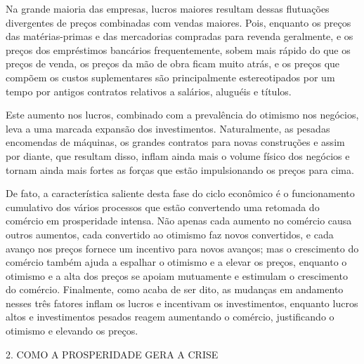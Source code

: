 \documentclass[12pt]{article}
\begin{document}
Na grande maioria das empresas, lucros maiores resultam dessas flutuações divergentes de preços combinadas com vendas maiores. Pois, enquanto os preços das matérias-primas e das mercadorias compradas para revenda geralmente, e os preços dos empréstimos bancários frequentemente, sobem mais rápido do que os preços de venda, os preços da mão de obra ficam muito atrás, e os preços que compõem os custos suplementares são principalmente estereotipados por um tempo por antigos contratos relativos a salários, aluguéis e títulos.

Este aumento nos lucros, combinado com a prevalência do otimismo nos negócios, leva a uma marcada expansão dos investimentos. Naturalmente, as pesadas encomendas de máquinas, os grandes contratos para novas construções e assim por diante, que resultam disso, inflam ainda mais o volume físico dos negócios e tornam ainda mais fortes as forças que estão impulsionando os preços para cima.

De fato, a característica saliente desta fase do ciclo econômico é o funcionamento cumulativo dos vários processos que estão convertendo uma retomada do comércio em prosperidade intensa. Não apenas cada aumento no comércio causa outros aumentos, cada convertido ao otimismo faz novos convertidos, e cada avanço nos preços fornece um incentivo para novos avanços; mas o crescimento do comércio também ajuda a espalhar o otimismo e a elevar os preços, enquanto o otimismo e a alta dos preços se apoiam mutuamente e estimulam o crescimento do comércio. Finalmente, como acaba de ser dito, as mudanças em andamento nesses três fatores inflam os lucros e incentivam os investimentos, enquanto lucros altos e investimentos pesados reagem aumentando o comércio, justificando o otimismo e elevando os preços.

2. COMO A PROSPERIDADE GERA A CRISE
\end{document}
